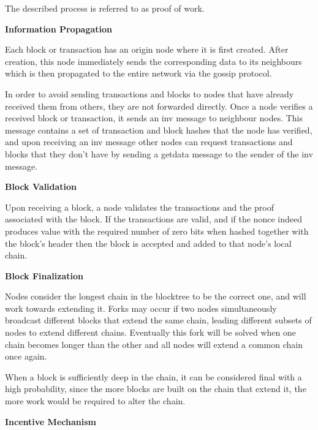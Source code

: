 The described process is referred to as proof of work.

\vspace{0.25cm}


\textbf{Information Propagation}

Each block or transaction has an origin node where it is first created. After creation, this node immediately sends the corresponding data to its neighbours which is then propagated to the entire network via the gossip protocol.

In order to avoid sending transactions and blocks to nodes that have already received them from others, they are not forwarded directly. Once  a node verifies a received block or transaction, it sends an inv message to neighbour nodes. This message contains a set of transaction and block hashes that the node has verified, and upon receiving an inv message other nodes can request transactions and blocks that they don’t have by sending a getdata message to the sender of the inv message.

\vspace{0.25cm}

\textbf{Block Validation}

Upon receiving a block, a node validates the transactions and the proof associated with the block. If the transactions are valid, and if the nonce indeed produces value with the required number of zero bits when hashed together with the block’s header then the block is accepted and added to that node’s local chain.

\vspace{0.25cm}

\textbf{Block Finalization}

Nodes consider the longest chain in the blocktree to be the correct one, and will work towards extending it. Forks may occur if two nodes simultaneously broadcast different blocks that extend the same chain, leading different subsets of nodes to extend different chains. Eventually this fork will be solved when one chain becomes longer than the other and all nodes will extend a common chain once again.

When a block is sufficiently deep in the chain, it can be considered final with a high probability, since the more blocks are built on the chain that extend it, the more work would be required to alter the chain.


\vspace{0.25cm}

\textbf{Incentive Mechanism}

